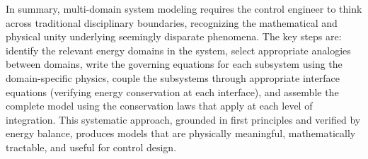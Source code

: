 In summary, multi-domain system modeling requires the control engineer to think across traditional disciplinary boundaries, recognizing the mathematical and physical unity underlying seemingly disparate phenomena. The key steps are: identify the relevant energy domains in the system, select appropriate analogies between domains, write the governing equations for each subsystem using the domain-specific physics, couple the subsystems through appropriate interface equations (verifying energy conservation at each interface), and assemble the complete model using the conservation laws that apply at each level of integration. This systematic approach, grounded in first principles and verified by energy balance, produces models that are physically meaningful, mathematically tractable, and useful for control design.
